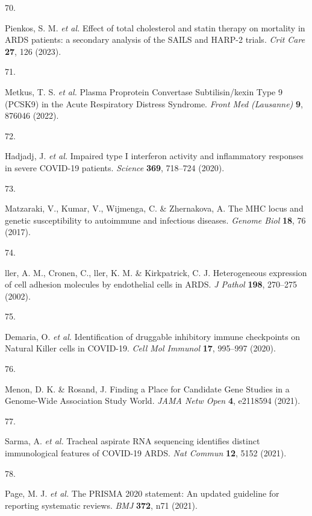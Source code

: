 \documentclass[
  11,
  a4paper,
]{article}
\newlength{\cslhangindent}
\newlength{\csllabelwidth}
\newenvironment{CSLReferences}[2] %
 {\begin{list}{}{%
  \setlength{\itemindent}{0pt}
  \setlength{\leftmargin}{0pt}
  \setlength{\parsep}{0pt}
  \ifodd #1
   \setlength{\leftmargin}{\cslhangindent}
   \setlength{\itemindent}{-1\cslhangindent}
  \fi
  \setlength{\itemsep}{#2\baselineskip}}}
 {\end{list}}
\newcommand{\CSLLeftMargin}[1]{\parbox[t]{\csllabelwidth}{\strut#1\strut}}
\newcommand{\CSLRightInline}[1]{\parbox[t]{\linewidth - \csllabelwidth}{\strut#1\strut}}
\begin{document}
\begin{CSLReferences}{0}{0}
\CSLLeftMargin{70. }%
\CSLRightInline{Pienkos, S. M. \emph{et al.} {{E}ffect of total
cholesterol and statin therapy on mortality in {A}{R}{D}{S} patients: a
secondary analysis of the {S}{A}{I}{L}{S} and {H}{A}{R}{P}-2 trials}.
\emph{Crit Care} \textbf{27}, 126 (2023).}

\CSLLeftMargin{71. }%
\CSLRightInline{Metkus, T. S. \emph{et al.} {{P}lasma {P}roprotein
{C}onvertase {S}ubtilisin/kexin {T}ype 9 ({P}{C}{S}{K}9) in the {A}cute
{R}espiratory {D}istress {S}yndrome}. \emph{Front Med (Lausanne)}
\textbf{9}, 876046 (2022).}

\CSLLeftMargin{72. }%
\CSLRightInline{Hadjadj, J. \emph{et al.} {{I}mpaired type {I}
interferon activity and inflammatory responses in severe
{C}{O}{V}{I}{D}-19 patients}. \emph{Science} \textbf{369}, 718--724
(2020).}

\CSLLeftMargin{73. }%
\CSLRightInline{Matzaraki, V., Kumar, V., Wijmenga, C. \& Zhernakova, A.
{{T}he {M}{H}{C} locus and genetic susceptibility to autoimmune and
infectious diseases}. \emph{Genome Biol} \textbf{18}, 76 (2017).}

\CSLLeftMargin{74. }%
\CSLRightInline{ller, A. M., Cronen, C., ller, K. M. \& Kirkpatrick, C.
J. {{H}eterogeneous expression of cell adhesion molecules by endothelial
cells in {A}{R}{D}{S}}. \emph{J Pathol} \textbf{198}, 270--275 (2002).}

\CSLLeftMargin{75. }%
\CSLRightInline{Demaria, O. \emph{et al.} {{I}dentification of druggable
inhibitory immune checkpoints on {N}atural {K}iller cells in
{C}{O}{V}{I}{D}-19}. \emph{Cell Mol Immunol} \textbf{17}, 995--997
(2020).}

\CSLLeftMargin{76. }%
\CSLRightInline{Menon, D. K. \& Rosand, J. {{F}inding a {P}lace for
{C}andidate {G}ene {S}tudies in a {G}enome-{W}ide {A}ssociation {S}tudy
{W}orld}. \emph{JAMA Netw Open} \textbf{4}, e2118594 (2021).}

\CSLLeftMargin{77. }%
\CSLRightInline{Sarma, A. \emph{et al.} {{T}racheal aspirate {R}{N}{A}
sequencing identifies distinct immunological features of
{C}{O}{V}{I}{D}-19 {A}{R}{D}{S}}. \emph{Nat Commun} \textbf{12}, 5152
(2021).}

\CSLLeftMargin{78. }%
\CSLRightInline{Page, M. J. \emph{et al.} The {PRISMA} 2020 statement:
An updated guideline for reporting systematic reviews. \emph{BMJ}
\textbf{372}, n71 (2021).}


\end{CSLReferences}
\end{document}
